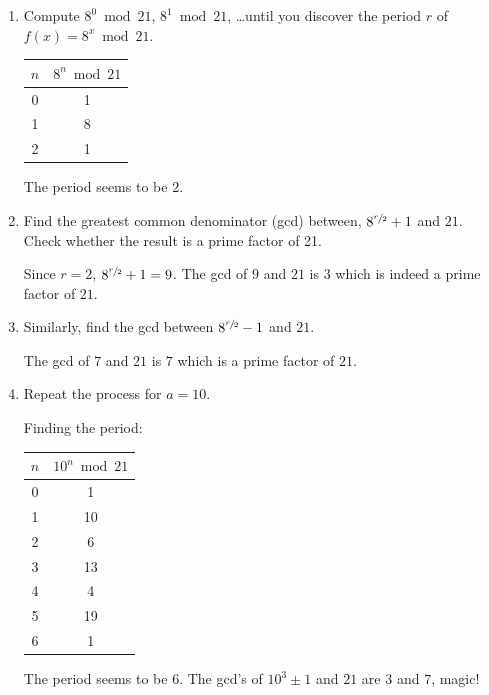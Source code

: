 \documentclass[12pt]{article}
\newenvironment{answer}{\begingroup\setlength{\leftskip}{-\leftmargin}\begin{framed}}{\end{framed}\endgroup}
\begin{document}
\begin{enumerate}
    \item Compute $8^0 \bmod 21$, $8^1 \bmod 21$, \ldots until you discover the period $r$ of $f(x) = 8^x \bmod 21$.

    \begin{answer}
        \begin{tabular}{c|c}
            $n$ & $8^n \bmod 21$ \\
            \hline
            0 & 1 \\
            1 & 8 \\
            2 & 1 \\
        \end{tabular}
        The period seems to be $2$.
    \end{answer}

    \item Find the greatest common denominator (gcd) between, $8^{\sfrac{r}{2}} + 1$ and $21$. Check whether the result is a prime factor of 21.

    \begin{answer}
        Since $r = 2$, $8^{\sfrac{r}{2}} + 1 = 9$. The gcd of $9$ and $21$ is $3$ which is indeed a prime factor of $21$.
    \end{answer}

    \item Similarly, find the gcd between $8^{\sfrac{r}{2}} - 1$ and $21$.

    \begin{answer}
        The gcd of $7$ and $21$ is $7$ which is a prime factor of $21$.
    \end{answer}

    \item Repeat the process for $a = 10$.

    \begin{answer}
        Finding the period:
        \begin{tabular}{c|c}
            $n$ & $10^n \bmod 21$ \\
            \hline
            0 & 1 \\
            1 & 10 \\
            2 & 6 \\
            3 & 13 \\
            4 & 4 \\
            5 & 19 \\
            6 & 1 \\
        \end{tabular}
        The period seems to be $6$.
        The gcd's of $10^3 \pm 1$ and $21$ are $3$ and $7$, magic!
    \end{answer}
\end{enumerate}
\end{document}
